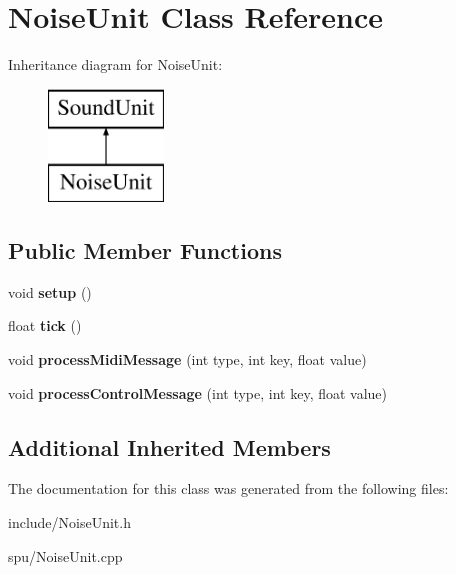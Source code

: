 \hypertarget{classNoiseUnit}{\section{Noise\-Unit Class Reference}
\label{classNoiseUnit}
}
Inheritance diagram for Noise\-Unit\-:\begin{figure}[H]
\begin{center}
\leavevmode
\includegraphics[height=3.000000cm]{classNoiseUnit}
\end{center}
\end{figure}
\subsection*{Public Member Functions}
\begin{DoxyCompactItemize}
\item 
\hypertarget{classNoiseUnit_a81666e8bdea833fad6a4451a765c6b83}{void {\bfseries setup} ()}\label{classNoiseUnit_a81666e8bdea833fad6a4451a765c6b83}

\item 
\hypertarget{classNoiseUnit_af48a9a915f7f593105e8fe2d2ddb745a}{float {\bfseries tick} ()}\label{classNoiseUnit_af48a9a915f7f593105e8fe2d2ddb745a}

\item 
\hypertarget{classNoiseUnit_a58e18639dc527bb67184b38107bd6acf}{void {\bfseries process\-Midi\-Message} (int type, int key, float value)}\label{classNoiseUnit_a58e18639dc527bb67184b38107bd6acf}

\item 
\hypertarget{classNoiseUnit_a755cc04254bf8ecba6082ea8d6151d6c}{void {\bfseries process\-Control\-Message} (int type, int key, float value)}\label{classNoiseUnit_a755cc04254bf8ecba6082ea8d6151d6c}

\end{DoxyCompactItemize}
\subsection*{Additional Inherited Members}


The documentation for this class was generated from the following files\-:\begin{DoxyCompactItemize}
\item 
include/Noise\-Unit.\-h\item 
spu/Noise\-Unit.\-cpp\end{DoxyCompactItemize}
